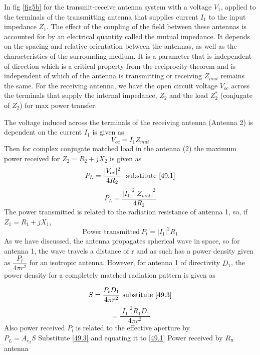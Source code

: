 In fig \ref{fig5b} for the transmit-receive antenna system with a voltage $V_1$, applied to the terminals of the transmitting antenna that supplies current $I_{1}$ to the input impedance $Z_{1}$. The effect of the coupling of the field between these antennas is accounted for by an electrical quantity called the mutual impedance. It depends on the spacing and relative orientation between the antennas, as well as the characteristics of the surrounding medium. It is a parameter that is independent of direction which is a critical property from the reciprocity theorem and is independent of which of the antenna is transmitting or receiving $Z_{mut}$ remains the same. For the receiving antenna, we have the open circuit voltage $V_{oc}$ across the terminals that supply the internal impedance, $Z_{2}$ and the load $Z_{2}^*$ (conjugate of $Z_{2}$) for max power transfer.

The voltage induced across the terminals of the receiving antenna (Antenna 2) is dependent on the current $I_{1}$ is given as
\begin{equation}
\label{49.1}
V_{oc}= I_{1}Z_{mut}
\end{equation}
Then for complex conjugate matched load in the antenna (2) the maximum power received for $Z_{2} = R_{2}+jX_{2}$ is given as
$$P_{L}=\dfrac{|V_{oc}|^{2}}{4R_{2}}\
\text{\ substitute\  \ref{49.1}}$$
\begin{equation}
P_{L} = \dfrac{|I_{1}|^{2}|Z_{mut}|^{2}}{4R_{2}}
\end{equation}
The power transmitted is related to the radiation resistance of antenna 1, so, if $Z_{1}=R_{1}+jX_{1}$,
\begin{equation}
\label{49.3}
\text{Power transmitted}\ P_{t}=|I_{1}|^{2}R_{1}
\end{equation}
As we have discussed, the antenna propagates spherical wave in space, so for antenna 1, the wave travels a distance of r and as such has a power density given as $\dfrac{P_{t}}{4\pi r^{2}}$ for an isotropic antenna. However, for antenna 1 of directivity $D_{1}$, the power density for a completely matched radiation pattern is given as

$$ S=\dfrac{P_{t} D_{1}}{4\pi r^{2}}\ \text{substitute \ref{49.3}}$$
\begin{equation}
= \dfrac{|I_{1}|^{2}R_{1}D_{1}}{4\pi r^{2}}
\label{eqn17b}
\end{equation}
Also power received $P_{l}$ is related to the effective aperture by\\ 
$P_{L}= A_{e_{2}}S$ Substitute \ref{49.3} and equating it to \ref{49.1}\newline
Power received by $R_{\textnormal{x}}$ antenna

